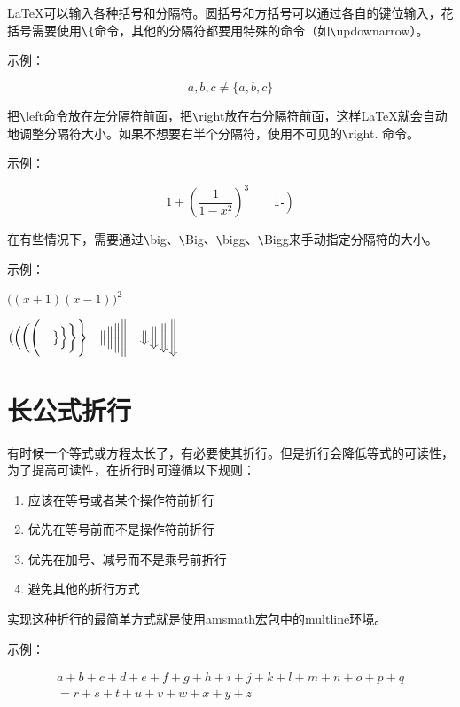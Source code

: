 \documentclass[UTF8]{ctexart}
\begin{document}
\LaTeX 可以输入各种括号和分隔符。圆括号和方括号可以通过各自的键位输入，花括号需要使用\texttt{\textbackslash}\texttt{\{}命令，其他的分隔符都要用特殊的命令（如\texttt{\textbackslash}updownarrow）。

示例：

\begin{equation*}
  {a,b,c} \neq \{a,b,c\}
\end{equation*}

把\texttt{\textbackslash}left命令放在左分隔符前面，把\texttt{\textbackslash}right放在右分隔符前面，这样\LaTeX 就会自动地调整分隔符大小。如果不想要右半个分隔符，使用不可见的\texttt{\textbackslash}right. 命令。

示例：

\begin{equation*}
  1 + \left(\frac{1}{1-x^{2}} \right)^3 \qquad
  \left. \ddagger \frac{~}{~}\right)
\end{equation*}

在有些情况下，需要通过\texttt{\textbackslash}big、\texttt{\textbackslash}Big、\texttt{\textbackslash}bigg、\texttt{\textbackslash}Bigg来手动指定分隔符的大小。

示例：

$\Big((x+1)(x-1)\Big)^{2}$

$\big( \Big( \bigg( \Bigg( \quad
\big\} \Big\} \bigg\} \Bigg\} \quad
\big\| \Big\| \bigg\| \Bigg\| \quad
\big\Downarrow \Big\Downarrow
\bigg\Downarrow \Bigg\Downarrow$

\section{长公式折行}
有时候一个等式或方程太长了，有必要使其折行。但是折行会降低等式的可读性，为了提高可读性，在折行时可遵循以下规则：
\begin{enumerate}
    \item 应该在等号或者某个操作符前折行
    \item 优先在等号前而不是操作符前折行
    \item 优先在加号、减号而不是乘号前折行
    \item 避免其他的折行方式
\end{enumerate}
实现这种折行的最简单方式就是使用amsmath宏包中的multline环境。

示例：

\begin{multline}
  a + b + c + d + e + f + g + h + i + j + k + l + m + n + o + p + q
  \\
  = r + s + t + u + v + w + x + y + z
\end{multline}
\end{document}
